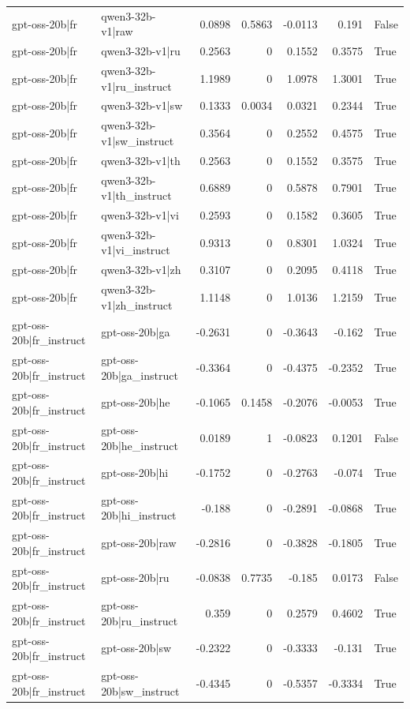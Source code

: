 \begin{table}
\begin{tabular}{l l r r r r l}
gpt-oss-20b|fr & qwen3-32b-v1|raw & 0.0898 & 0.5863 & -0.0113 & 0.191 & False \\
gpt-oss-20b|fr & qwen3-32b-v1|ru & 0.2563 & 0 & 0.1552 & 0.3575 & True \\
gpt-oss-20b|fr & qwen3-32b-v1|ru_instruct & 1.1989 & 0 & 1.0978 & 1.3001 & True \\
gpt-oss-20b|fr & qwen3-32b-v1|sw & 0.1333 & 0.0034 & 0.0321 & 0.2344 & True \\
gpt-oss-20b|fr & qwen3-32b-v1|sw_instruct & 0.3564 & 0 & 0.2552 & 0.4575 & True \\
gpt-oss-20b|fr & qwen3-32b-v1|th & 0.2563 & 0 & 0.1552 & 0.3575 & True \\
gpt-oss-20b|fr & qwen3-32b-v1|th_instruct & 0.6889 & 0 & 0.5878 & 0.7901 & True \\
gpt-oss-20b|fr & qwen3-32b-v1|vi & 0.2593 & 0 & 0.1582 & 0.3605 & True \\
gpt-oss-20b|fr & qwen3-32b-v1|vi_instruct & 0.9313 & 0 & 0.8301 & 1.0324 & True \\
gpt-oss-20b|fr & qwen3-32b-v1|zh & 0.3107 & 0 & 0.2095 & 0.4118 & True \\
gpt-oss-20b|fr & qwen3-32b-v1|zh_instruct & 1.1148 & 0 & 1.0136 & 1.2159 & True \\
gpt-oss-20b|fr_instruct & gpt-oss-20b|ga & -0.2631 & 0 & -0.3643 & -0.162 & True \\
gpt-oss-20b|fr_instruct & gpt-oss-20b|ga_instruct & -0.3364 & 0 & -0.4375 & -0.2352 & True \\
gpt-oss-20b|fr_instruct & gpt-oss-20b|he & -0.1065 & 0.1458 & -0.2076 & -0.0053 & True \\
gpt-oss-20b|fr_instruct & gpt-oss-20b|he_instruct & 0.0189 & 1 & -0.0823 & 0.1201 & False \\
gpt-oss-20b|fr_instruct & gpt-oss-20b|hi & -0.1752 & 0 & -0.2763 & -0.074 & True \\
gpt-oss-20b|fr_instruct & gpt-oss-20b|hi_instruct & -0.188 & 0 & -0.2891 & -0.0868 & True \\
gpt-oss-20b|fr_instruct & gpt-oss-20b|raw & -0.2816 & 0 & -0.3828 & -0.1805 & True \\
gpt-oss-20b|fr_instruct & gpt-oss-20b|ru & -0.0838 & 0.7735 & -0.185 & 0.0173 & False \\
gpt-oss-20b|fr_instruct & gpt-oss-20b|ru_instruct & 0.359 & 0 & 0.2579 & 0.4602 & True \\
gpt-oss-20b|fr_instruct & gpt-oss-20b|sw & -0.2322 & 0 & -0.3333 & -0.131 & True \\
gpt-oss-20b|fr_instruct & gpt-oss-20b|sw_instruct & -0.4345 & 0 & -0.5357 & -0.3334 & True \\

\end{tabular}
\end{table}
